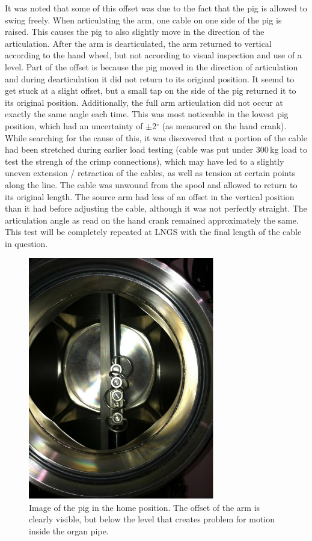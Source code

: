 \begin{itemize}
 It was noted that some of this offset was due to the fact that the pig is allowed to swing freely. When articulating the arm, one cable on one side of the pig is raised. This causes the pig to also slightly move in the direction of the articulation. After the
arm is dearticulated, the arm returned to vertical according to the hand wheel, but not according to visual
inspection and use of a level. Part of the offset is because the pig moved in the direction of articulation and
during dearticulation it did not return to its original position. It seemd to get stuck at a slight offset, but a
small tap on the side of the pig returned it to its original position. Additionally, the full arm articulation did
not occur at exactly the same angle each time. This was most noticeable in the lowest pig position, which
had an uncertainty of $\pm$2$^{\circ}$ (as measured on the hand crank). While searching for the cause of
this, it was discovered that a portion of the cable had been stretched during earlier load testing (cable was put under 300\,kg load to test the strengh of the crimp connections), which may have
led to a slightly uneven extension / retraction of the cables, as well as tension at certain points along the
line. The cable was unwound from the spool and allowed to return to its original length.
 The source arm had less of an offset in the vertical position than it had before adjusting the cable, although it was not perfectly straight. The articulation angle as read on the hand crank remained approximately the
same. This test will be completely repeated at LNGS with the final length of the cable in question.

\begin{figure}[htbp]
 \centering
 \includegraphics[width=3.2in]{Figures/ArticulationOffset1.jpg}
 \caption{Image of the pig in the home position. The offset of the arm is clearly visible, but below the level that creates problem for motion inside the organ pipe.}
 \label{fig:art_offset1}
\end{figure}


\end{itemize}
